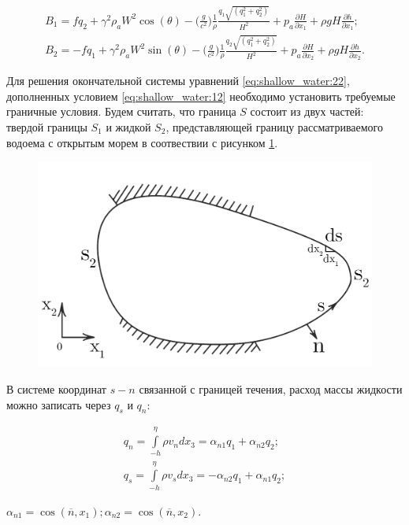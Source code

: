 \documentclass[14pt]{extreport}
\begin{document}

\begin{equation}\label{eq:shallow_water:23}
\begin{aligned}
B_1=fq_2+\gamma^2\rho_aW^2\cos(\theta)-\bigg(\frac{g}{c^2}\bigg)\frac{1}{\rho}\frac{q_1\sqrt{(q_1^2+q_2^2)}}{H^2} + p_a \frac{\partial H}{\partial x_1} + \rho gH\frac{\partial h}{\partial x_1}; \\
B_2=-fq_1+\gamma^2\rho_aW^2\sin(\theta)-\bigg(\frac{g}{c^2}\bigg)\frac{1}{\rho}\frac{q_2\sqrt{(q_1^2+q_2^2)}}{H^2} + p_a \frac{\partial H}{\partial x_2} + \rho gH\frac{\partial h}{\partial x_2}.
\end{aligned}
\end{equation}

Для решения окончательной системы уравнений \ref{eq:shallow_water:22}, дополненных условием \ref{eq:shallow_water:12} необходимо установить требуемые граничные условия. Будем считать, что граница $S$ состоит из двух частей: твердой границы $S_1$ и жидкой $S_2$, представляющей границу рассматриваемого водоема с открытым морем в соотвествии с рисунком \ref{img:shallow_water:3}.

\begin{figure}[H]
\centerline{\includegraphics[width=0.5\linewidth]{images/shallow_water_3}}
\caption{}
\label{img:shallow_water:3}
\end{figure}

В системе координат $s-n$ связанной с границей течения, расход массы жидкости можно записать через $q_s$ и $q_n$:

\begin{equation}\label{eq:shallow_water:24}
\begin{aligned}
q_n=\int\limits^\eta_{-h} \rho v_n dx_3= \alpha_{n1}q_1+\alpha_{n2}q_2; \\
q_s=\int\limits^\eta_{-h} \rho v_s dx_3= -\alpha_{n2}q_1+\alpha_{n1}q_2;
\end{aligned}
\end{equation}

 $\alpha_{n1}=\cos(\overline{n},x_1); \alpha_{n2}=\cos(\overline{n},x_2).$
\end{document}
